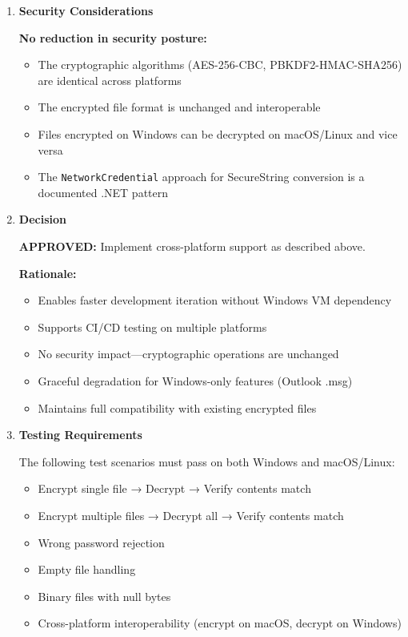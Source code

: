 \documentclass[11pt,letterpaper]{article}
\newcommand{\dmsection}[1]{\item \textbf{#1}\par}
\begin{document}
\begin{enumerate}
\dmsection{Security Considerations}

\textbf{No reduction in security posture:}
\begin{itemize}
    \item The cryptographic algorithms (AES-256-CBC, PBKDF2-HMAC-SHA256) are identical across platforms
    \item The encrypted file format is unchanged and interoperable
    \item Files encrypted on Windows can be decrypted on macOS/Linux and vice versa
    \item The \texttt{NetworkCredential} approach for SecureString conversion is a documented .NET pattern
\end{itemize}

\dmsection{Decision}

\textbf{APPROVED:} Implement cross-platform support as described above.

\textbf{Rationale:}
\begin{itemize}
    \item Enables faster development iteration without Windows VM dependency
    \item Supports CI/CD testing on multiple platforms
    \item No security impact---cryptographic operations are unchanged
    \item Graceful degradation for Windows-only features (Outlook .msg)
    \item Maintains full compatibility with existing encrypted files
\end{itemize}

\dmsection{Testing Requirements}

The following test scenarios must pass on both Windows and macOS/Linux:

\begin{itemize}
    \item Encrypt single file → Decrypt → Verify contents match
    \item Encrypt multiple files → Decrypt all → Verify contents match
    \item Wrong password rejection
    \item Empty file handling
    \item Binary files with null bytes
    \item Cross-platform interoperability (encrypt on macOS, decrypt on Windows)
\end{itemize}

\end{enumerate}
\end{document}
